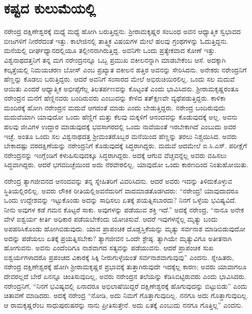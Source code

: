 
\chapter{ಕಷ್ಟದ ಕುಲುಮೆಯಲ್ಲಿ}

ನರೇಂದ್ರ ದಕ್ಷಿಣೇಶ್ವರಕ್ಕೆ ಮಧ್ಯೆ ಮಧ್ಯೆ ಹೋಗಿ ಬರುತ್ತಿದ್ದನು. ಶ‍್ರೀರಾಮಕೃಷ್ಣರ ಸಂಬಂಧ ಅವನ ಆಧ್ಯಾತ್ಮಿಕ ಸ್ವಭಾವದ ಬೀಜಗಳಿಗೆ ನೀರೆರೆದಂತೆ ಇತ್ತು. ಕಾಲೇಜಿನಲ್ಲಿ ತಾತ್ತ್ವಿಕ ವಿಷಯಗಳ ಮೇಲೆ ಹಲವು ಗ್ರಂಥಗಳನ್ನು ಓದುತ್ತಿದ್ದನು. ಮನೆಯಲ್ಲಿ ದೀರ್ಘಧ್ಯಾನದಲ್ಲಿಯೂ ತಲ್ಲೀನನಾಗಿರುತ್ತಿದ್ದ. ಅವನಿಗೇ ಒಂದು ಪ್ರತ್ಯೇಕವಾದ ಕೋಣೆ ಇತ್ತು. ವಿಶ್ವನಾಥದತ್ತನಿಗೆ ತನ್ನ ಮಗ ನರೇಂದ್ರನನ್ನೂ ಒಬ್ಬ ಪ್ರಮುಖ ವಕೀಲನನ್ನಾಗಿ ಮಾಡಬೇಕೆಂಬ ಆಸೆ. ಅದಕ್ಕಾಗಿ ಕಲ್ಕತ್ತೆಯಲ್ಲಿ ನಿಮಯಚರಣ ಬೋಸ್ ಎಂಬ ಪ್ರಖ್ಯಾತ ವಕೀಲನ ಹತ್ತಿರ ಅವನನ್ನು ಸೇರಿಸಿದನು. ಅನೇಕರು ನರೇಂದ್ರನಿಗೆ ಹೆಣ್ಣನ್ನು ಕೊಡಲು ಬರುತ್ತಿದ್ದರು. ಆದರೆ ಅವನಿಗೆ ಸಂಸಾರದ ಮೇಲೆ ಅಭಿರುಚಿಯಿರಲಿಲ್ಲ. ಒಂದು ಸಲ ಮದುವೆ ಆಯಿತು ಎಂದರೆ ಆಧ್ಯಾತ್ಮಿಕ ಅಭೀಪ್ಸೆಗೆಲ್ಲ ತಿಲತರ್ಪಣವನ್ನು ಕೊಟ್ಟಂತೆ ಎಂದು ಭಾವಿಸಿದನು. ಶ‍್ರೀರಾಮಕೃಷ್ಣರಂತೂ ನರೇಂದ್ರನ ಮನೆಗೆ ಹೆಣ್ಣಿನವರು ಬಂದಿರುವರು ಎಂಬುದನ್ನು ಕೇಳಿದ ತತ್‍ಕ್ಷಣವೇ ವ್ಯಥೆಪಡುತ್ತಿದ್ದರು. ಕಾಳಿಕಾ ಮಂದಿರಕ್ಕೆ ಹೋಗಿ ನರೇಂದ್ರನ ಮದುವೆ ಆಗದಂತೆ ಮಾಡು ಎಂದು ಬೇಡುತ್ತಿದ್ದರು. ನರೇಂದ್ರ ಬಂದಿರುವುದು ಮದುವೆಯಾಗಿ ಯಾವುದೋ ಒಂದು ಹೆಣ್ಣಿಗೆ ಮತ್ತು ಕೆಲವು ಮಕ್ಕಳಿಗೆ ಆನಂದವನ್ನು ಕೊಡುವುದಕ್ಕೆ ಅಲ್ಲ. ಅವನು ಹಲವು ಜೀವಿಗಳ ಉದ್ಧಾರ ಮಾಡುವುದಕ್ಕೆ ಭವಸಾಗರದಲ್ಲಿ ಒಂದು ನಾವೆಯಂತೆ ಇರಬೇಕಾಗಿದೆ ಎಂಬುದು ಅವರ ಇಚ್ಛೆ. ಅಂತೂ ಒಂದು ಸಲ ವಿಶ್ವನಾಥದತ್ತ ಶ‍್ರೀಮಂತರೊಬ್ಬರ ಮನೆಯಿಂದ ಹೆಣ್ಣನ್ನು ತರಲು ನಿಶ್ಚಯಿಸಿದ. ಅವರು ಬೇಕಾದಷ್ಟು ವರದಕ್ಷಿಣೆಯನ್ನು ನರೇಂದ್ರನಿಗೆ ಕೊಡುವುದಕ್ಕೆ ಸಿದ್ಧರಾಗಿದ್ದರು. ಮದುವೆ ಆದಮೇಲೆ ಐ.ಸಿ.ಎಸ್. ಪರೀಕ್ಷೆಗೆ ನರೇಂದ್ರನನ್ನು ಇಂಗ್ಲೆಂಡಿಗೆ ಕಳುಹಿಸುವುದಕ್ಕೂ ಸಿದ್ಧರಾಗಿದ್ದರು. ಅದಕ್ಕೆ ಆಗುವ ವೆಚ್ಚವನ್ನೆಲ್ಲ ಅವರು ವಹಿಸಲು ಸಿದ್ಧವಾಗಿದ್ದರು. ಆದರೆ ಭಗವದಿಚ್ಛೆಯಿಂದ ಅದು ನೆರವೇರಲಿಲ್ಲ. ಯಾವುದೋ ಒಂದು ಕಾರಣದಿಂದ ನಿಂತುಹೋಯಿತು.

ನರೇಂದ್ರ ತ್ಯಾಗಜೀವನದ ಆನಂದವನ್ನು ತನ್ನ ಸ್ನೇಹಿತರಿಗೆ ವಿವರಿಸಿದನು. ಆದರೆ ಅವರು ಇದನ್ನು ತಿಳಿದುಕೊಳ್ಳುವ ಸ್ಥಿತಿಯಲ್ಲಿರಲಿಲ್ಲ. ಅವರು ಲೌಕಿಕ ರೀತಿಯಲ್ಲಿ\break ಅವನೆದುರಿಗೆ ವಾದಮಾಡತೊಡಗಿದರು: “ನರೇಂದ್ರ! ಯಾವುದಾದರೂ ಒಂದು ಉದ್ದೇಶವನ್ನು ಇಟ್ಟುಕೊಂಡು ಅದನ್ನು ಸಾಧಿಸಲು ಏತಕ್ಕೆ ಪಯತ್ನಿಸಬಾರದು? ನಿನಗೆ ಒಳ್ಳೆಯ ಭವಿಷ್ಯವಿದೆ. ನೀನು ಅವುಗಳ ಕಡೆ ಗಮನ ಕೊಟ್ಟರೆ ಸಾಕು. ಅವುಗಳನ್ನು ಪಡೆಯುವ ಶಕ್ತಿ ಇದೆ.” ಅದಕ್ಕೆ ನರೇಂದ್ರ, “ನಾನೂ ಅನೇಕ ವೇಳೆ ಐಶ್ವರ್ಯ ಕೀರ್ತಿ ಅಧಿಕಾರ ಪಡೆಯಬೇಕೆಂದು ಯೋಚಿಸುವೆ. ಆದರೆ ಇವುಗಳನ್ನೆಲ್ಲ ಮೃತ್ಯು ಬಂದು ಅಪಹರಿಸಿಕೊಂಡು ಹೋಗಿಬಿಡುವುದು. ಯಾವ ಪ್ರಾಪಂಚಿಕ ದೊಡ್ಡಸ್ತಿಕೆಯನ್ನು ಮೃತ್ಯು ಸರ್ವನಾಶ ಮಾಡಿಬಿಡುವುದೋ ಅದನ್ನು ಪಡೆಯಲು ಏತಕ್ಕೆ ಪ್ರಯತ್ನಿಸಬೇಕು? ತ್ಯಾಗಜೀವನ ಒಂದೇ ಶ್ರೇಷ್ಠ. ತ್ಯಾಗಿಯೇ ಮೃತ್ಯುವಿಗೂ ಅತೀತನಾಗಿ ಹೋಗುವನು. ಅವನು ಎಂದೆಂದಿಗೂ ನಾಶವಾಗದ ಸತ್ಯವನ್ನು ಪಡೆಯುವನು. ಆದರೆ ಪ್ರಾಪಂಚಿಕ ಸುಖ ಐಶ್ವರ್ಯಗಳಾದರೊ ಪ್ರಪಂಚದ ವಿಕಾರಕ್ಕೆ ಸಿಕ್ಕಿ ನೀರುಗುಳ್ಳೆಯಂತೆ ಸರ್ವನಾಶವಾಗುವುವು” ಎಂದನು. ಸ್ನೇಹಿತರು, ನರೇಂದ್ರ ದಕ್ಷಿಣೇಶ್ವರಕ್ಕೆ ಹೋಗಿ ಶ‍್ರೀರಾಮಕೃಷ್ಣರ ಪ್ರಭಾವಕ್ಕೆ ತುತ್ತಾಗಿರುವುದೇ ಇದಕ್ಕೆಲ್ಲ ಕಾರಣ; ಅವರು ಯಾವಾಗಲೂ ದೇವರಲ್ಲದೆ ಬೇರೆ ಏನನ್ನೂ ಚಿಂತಿಸುವುದಿಲ್ಲ, ಅವರು ನರೇಂದ್ರನ ತಲೆಯನ್ನು ಕೆಡಿಸಿಬಿಟ್ಟಿರುವರು ಎಂದು ಭಾವಿಸಿದರು. ನರೇಂದ್ರನಿಗೆ, “ನಿನಗೆ ಭವಿಷ್ಯದಲ್ಲಿ ಏನಾದರೂ ಅಭಿಲಾಷೆಯಿದ್ದರೆ ದಕ್ಷಿಣೇಶ್ವರಕ್ಕೆ ಹೊಗುವುದನ್ನು ಬಿಟ್ಟುಬಿಡು” ಎಂದು ಚಿತಾವಣೆ ಮಾಡಿದರು. ಅದಕ್ಕೆ ನರೇಂದ್ರ “ನೋಡಿ, ಅದು ನಿಮಗೆ ಗೊತ್ತಾಗುವುದಿಲ್ಲ. ನನಗೂ ಅದು ಗೊತ್ತಾಗುವುದಿಲ್ಲ. ಆ ರಾಮಕೃಷ್ಣರೆಂಬ ಸಾಧುಪುರುಷರನ್ನು ನಾನು ಪ್ರೀತಿಸುತ್ತೇನೆ. ಅದು ಏತಕ್ಕೆ ಎಂಬುದು ನನಗೂ ಗೊತ್ತಿಲ್ಲ” ಎಂದನು.

